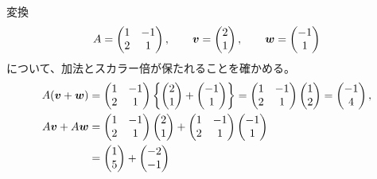 \begin{example}
変換
\[
 A=\begin{pmatrix}1&-1\\2&1\end{pmatrix},\qquad
 \bm{v}=\begin{pmatrix}2\\1\end{pmatrix},\qquad
 \bm{w}=\begin{pmatrix}-1\\1\end{pmatrix}
\]
について、加法とスカラー倍が保たれることを確かめる。
\begin{align*}
 A(\vect{v}+\vect{w})
 &=\begin{pmatrix}1&-1\\2&1\end{pmatrix}
   \left\{\begin{pmatrix}2\\1\end{pmatrix}
   +\begin{pmatrix}-1\\1\end{pmatrix}\right\}
 =\begin{pmatrix}1&-1\\2&1\end{pmatrix}
  \begin{pmatrix}1\\2\end{pmatrix}
 =\begin{pmatrix}-1\\4\end{pmatrix},\\
 A\vect{v}+A\vect{w}
 &=\begin{pmatrix}1&-1\\2&1\end{pmatrix}\begin{pmatrix}2\\1\end{pmatrix}
  +\begin{pmatrix}1&-1\\2&1\end{pmatrix}\begin{pmatrix}-1\\1\end{pmatrix}\\
 &=\begin{pmatrix}1\\5\end{pmatrix}+\begin{pmatrix}-2\\-1\end{pmatrix}

\end{align*}
\end{example}
